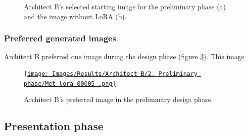 \begin{figure}[H]
\begin{subfigure}[b]{0.3\textwidth}
        \caption{}
        \label{B-preliminary-selected-b}
    \end{subfigure}
    \caption{Architect B's selected starting image for the preliminary phase (a) and the image without LoRA (b).}
    \label{fig:B-preliminary-selected}
\end{figure}
\subsubsection{Preferred generated images}
Architect B preferred one image during the design phase (figure \ref{fig:B-preliminary-preferred}). This image 
\begin{figure}[H]
    \centering
    \href{https://github.com/matijspeeters/Thesis/blob/main/Images/Results/Architect%20B/2.%20Preliminary%20phase/Met_lora_00005_.png}{\texttt{[image: Images/Results/Architect B/2. Preliminary phase/Met\_lora\_00005\_.png]}}
    \caption{Architect B's preferred image in the preliminary design phase.}
    \label{fig:B-preliminary-preferred}
\end{figure}
\subsection{Presentation phase}
